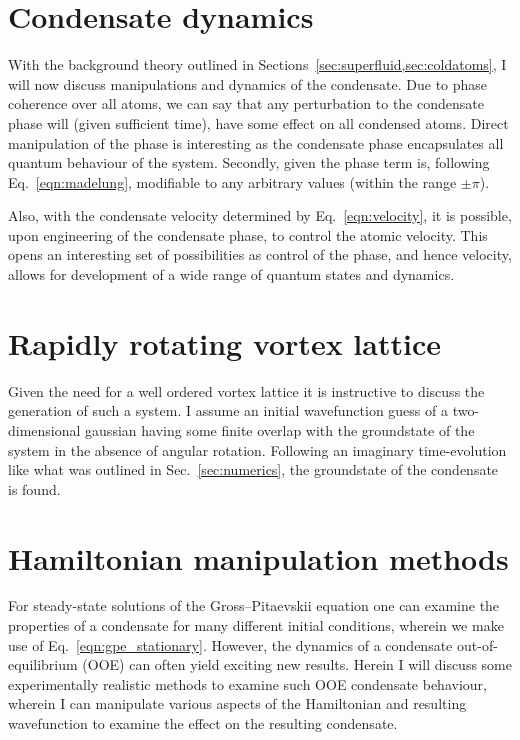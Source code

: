 \section{Condensate dynamics}
With the background theory outlined in Sections~\ref{sec:superfluid,sec:coldatoms}, I will now discuss manipulations and dynamics of the condensate. Due to phase coherence over all atoms, we can say that any perturbation to the condensate phase will (given sufficient time), have some effect on all condensed atoms. Direct manipulation of the phase is interesting as the condensate phase encapsulates all quantum behaviour of the system. Secondly, given the phase term is, following Eq.~\ref{eqn:madelung}, modifiable to any arbitrary values (within the range $\pm \pi$).

Also, with the condensate velocity determined by Eq.~\ref{eqn:velocity}, it is possible, upon engineering of the condensate phase, to control the atomic velocity. This opens an interesting set of possibilities as control of the phase, and hence velocity, allows for development of a wide range of quantum states and dynamics.





\section{Rapidly rotating vortex lattice}
Given the need for a well ordered vortex lattice it is instructive to discuss the generation of such a system. I assume an initial wavefunction guess of a two-dimensional gaussian having some finite overlap with the groundstate of the system in the absence of angular rotation. Following an imaginary time-evolution like what was outlined in Sec.~\ref{sec:numerics}, the groundstate of the condensate is found.

\section{Hamiltonian manipulation methods}
For steady-state solutions of the Gross--Pitaevskii equation one can examine the properties of a condensate for many different initial conditions, wherein we make use of Eq.~\ref{eqn:gpe_stationary}. However, the dynamics of a condensate out-of-equilibrium (OOE) can often yield exciting new results. Herein I will discuss some experimentally realistic methods to examine such OOE condensate behaviour, wherein I can manipulate various aspects of the Hamiltonian and resulting wavefunction to examine the effect on the resulting condensate.

